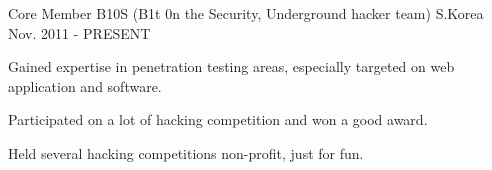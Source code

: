 \begin{cventries}
\cventry
{Core Member} %
{B10S (B1t 0n the Security, Underground hacker team)} %
{S.Korea} %
{Nov. 2011 - PRESENT} %
{
  \begin{cvitems} %
    \item {Gained expertise in penetration testing areas, especially targeted on web application and software.}
    \item {Participated on a lot of hacking competition and won a good award.}
    \item {Held several hacking competitions non-profit, just for fun.}
  \end{cvitems}
}
\end{cventries}

